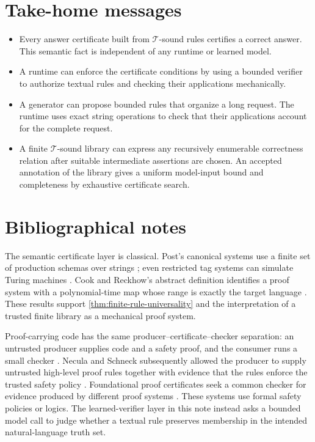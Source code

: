 \documentclass[11pt,twoside]{article}
\theoremstyle{definition}
\newcommand{\True}{\mathcal T}
\begin{document}
\section{Take-home messages}
\begin{itemize}[leftmargin=*]
\item Every answer certificate built from $\True$-sound rules certifies a
correct answer. This semantic fact is independent of any runtime or learned
model.
\item A runtime can enforce the certificate conditions by using a bounded
verifier to authorize textual rules and checking their applications
mechanically.
\item A generator can propose bounded rules that organize a long request. The
runtime uses exact string operations to check that their applications account
for the complete request.
\item A finite $\True$-sound library can express any recursively enumerable
correctness relation after suitable intermediate assertions are chosen. An
accepted annotation of the library gives a uniform model-input bound and
completeness by exhaustive certificate search.
\end{itemize}

\printendnotes
\section*{Bibliographical notes}
The semantic certificate layer is classical. Post's canonical systems use a
finite set of production schemas over strings \cite{post}; even restricted
tag systems can simulate Turing machines \cite{cocke-minsky}. Cook and
Reckhow's abstract definition identifies a proof system with a
polynomial-time map whose range is exactly the target language
\cite{cook-reckhow}. These results support
\cref{thm:finite-rule-universality} and the interpretation of a trusted finite
library as a mechanical proof system.

Proof-carrying code has the same producer--certificate--checker separation:
an untrusted producer supplies code and a safety proof, and the consumer runs
a small checker \cite{necula-pcc}. Necula and Schneck subsequently allowed
the producer to supply untrusted high-level proof rules together with evidence
that the rules enforce the trusted safety policy \cite{necula-schneck}.
Foundational proof certificates seek a common checker for evidence produced
by different proof systems \cite{miller-fpc}. These systems use formal safety
policies or logics. The learned-verifier layer in this note instead asks a
bounded model call to judge whether a textual rule preserves membership in
the intended natural-language truth set.
\end{document}

